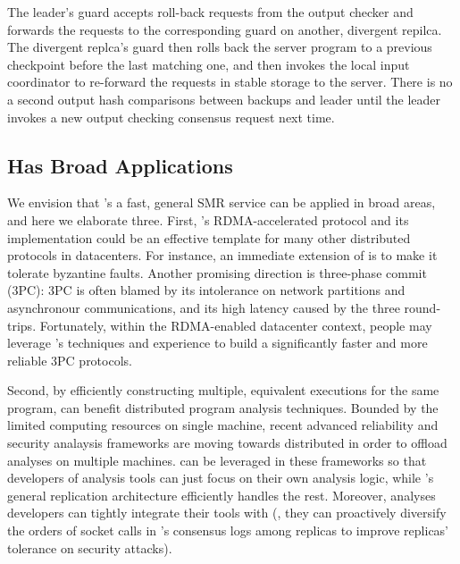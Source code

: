 The leader's guard accepts roll-back requests from the output checker and 
forwards the requests to the corresponding guard on another, divergent repilca. 
The divergent replca's guard then rolls back the server program to a previous 
checkpoint before the last matching one, and then invokes the local input 
coordinator to re-forward the requests in stable storage to the server. There 
is no a second output hash comparisons between backups and leader until the 
leader invokes a new output checking consensus request next time.


\subsection{\xxx Has Broad Applications}\label{sec:apps}

We envision that \xxx's a fast, general SMR service can be applied in broad 
areas, and here we elaborate three. First, \xxx's RDMA-accelerated \paxos 
protocol and its implementation could be an effective template for many other 
distributed protocols in datacenters. For instance, an immediate extension of 
\xxx is to make it tolerate byzantine faults. Another promising direction is 
three-phase commit (3PC): 3PC is often blamed by its intolerance on network 
partitions and asynchronour communications, and its high latency caused by the 
three round-trips. Fortunately, within the RDMA-enabled datacenter context, 
people may leverage \xxx's techniques and experience to build a significantly 
faster and more reliable 3PC protocols.


Second, by efficiently constructing multiple, equivalent executions for the 
same program, \xxx can benefit distributed program analysis techniques. Bounded 
by the limited computing resources on single machine, recent advanced 
reliability and security analaysis frameworks are moving towards distributed in 
order to offload analyses on multiple machines. \xxx can be leveraged in these 
frameworks so that developers of analysis tools can just focus on their own 
analysis logic, while \xxx's general replication architecture efficiently 
handles the rest. Moreover, analyses developers can tightly integrate their 
tools with \xxx (\eg, they can proactively diversify the orders of socket 
calls in \xxx's consensus logs among replicas to improve replicas' tolerance on
security attacks).


